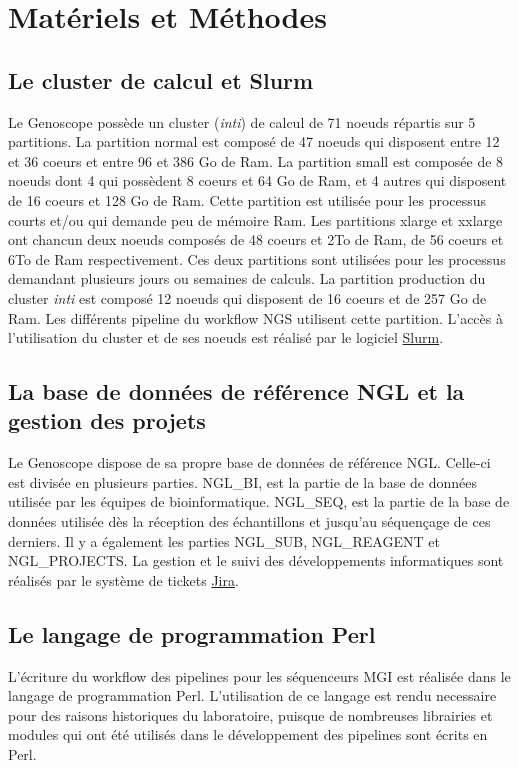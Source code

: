 \section{Matériels et Méthodes}
\subsection{Le cluster de calcul et Slurm}
Le Genoscope possède un cluster (\emph{inti}) de calcul de 71 noeuds répartis sur 5 partitions. La partition \og normal\fg{} est composé de 47 noeuds qui disposent entre 12 et 36 coeurs et entre 96 et 386 Go de Ram. La partition \og small\fg{} est composée de 8 noeuds dont 4 qui possèdent 8 coeurs et 64 Go de Ram, et 4 autres qui disposent de 16 coeurs et 128 Go de Ram. Cette partition est utilisée pour les processus courts et/ou qui demande peu de mémoire Ram. Les partitions \og xlarge \fg{} et \og xxlarge\fg{} ont chancun deux noeuds composés de 48 coeurs et 2To de Ram, de 56 coeurs et 6To de Ram respectivement. Ces deux partitions sont utilisées pour les processus demandant plusieurs jours ou semaines de calculs.
La partition \og production\fg{} du cluster \emph{inti} est composé 12 noeuds qui disposent de 16 coeurs et de 257 Go de Ram. Les différents pipeline du workflow NGS utilisent cette partition.
L'accès à l'utilisation du cluster et de ses noeuds est réalisé par le logiciel \href{https://slurm.schedmd.com/documentation.html}{Slurm}.

\subsection{La base de données de référence NGL et la gestion des projets}
Le Genoscope dispose de sa propre base de données de référence NGL. Celle-ci est divisée en plusieurs parties. NGL\_BI, est la partie de la base de données utilisée par les équipes de bioinformatique. NGL\_SEQ, est la partie de la base de données utilisée dès la réception des échantillons et jusqu'au séquençage de ces derniers. Il y a également les parties NGL\_SUB, NGL\_REAGENT et NGL\_PROJECTS. La gestion et le suivi des développements informatiques sont réalisés par le système de tickets \href{https://www.atlassian.com/fr/software/jira}{Jira}.

\subsection{Le langage de programmation Perl}
L'écriture du workflow des pipelines pour les séquenceurs MGI est réalisée dans le langage de programmation Perl. L'utilisation de ce langage est rendu necessaire pour des raisons historiques du laboratoire, puisque de nombreuses librairies et modules qui ont été utilisés dans le développement des pipelines sont écrits en Perl.\\

